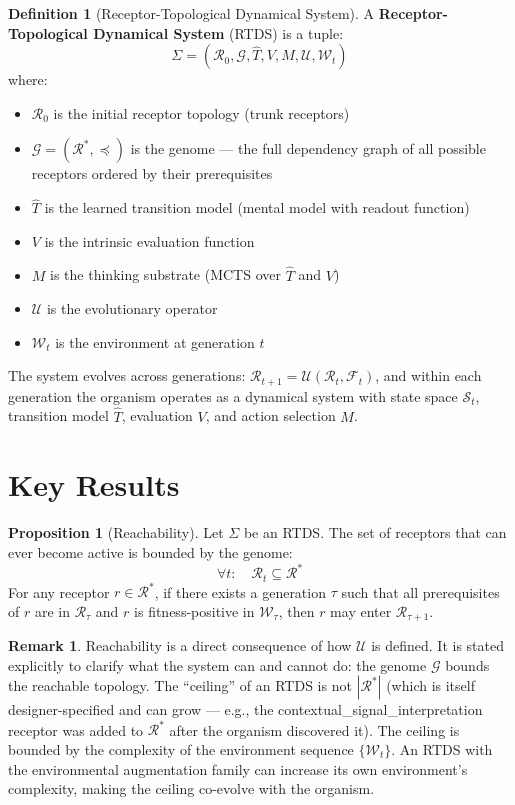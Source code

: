 \documentclass[12pt]{article}
\theoremstyle{definition}
\newtheorem{definition}{Definition}
\newtheorem{proposition}{Proposition}
\newtheorem{remark}{Remark}
\begin{document}
\begin{definition}[Receptor-Topological Dynamical System]
A \textbf{Receptor-Topological Dynamical System} (RTDS) is a tuple:
\[
\Sigma = (\mathcal{R}_0, \mathcal{G}, \hat{T}, V, M, \mathcal{U}, \mathcal{W}_t)
\]
where:
\begin{itemize}
    \item $\mathcal{R}_0$ is the initial receptor topology (trunk receptors)
    \item $\mathcal{G} = (\mathcal{R}^*, \preceq)$ is the genome --- the full dependency graph
    of all possible receptors ordered by their prerequisites
    \item $\hat{T}$ is the learned transition model (mental model with readout function)
    \item $V$ is the intrinsic evaluation function
    \item $M$ is the thinking substrate (MCTS over $\hat{T}$ and $V$)
    \item $\mathcal{U}$ is the evolutionary operator
    \item $\mathcal{W}_t$ is the environment at generation $t$
\end{itemize}
The system evolves across generations: $\mathcal{R}_{t+1} = \mathcal{U}(\mathcal{R}_t, \mathcal{F}_t)$,
and within each generation the organism operates as a dynamical system with state space
$\mathcal{S}_t$, transition model $\hat{T}$, evaluation $V$, and action selection $M$.
\end{definition}

\section{Key Results}

\begin{proposition}[Reachability]
Let $\Sigma$ be an RTDS. The set of receptors that can ever become active is bounded by
the genome:
\[
\forall t: \quad \mathcal{R}_t \subseteq \mathcal{R}^*
\]
For any receptor $r \in \mathcal{R}^*$, if there exists a generation $\tau$ such that
all prerequisites of $r$ are in $\mathcal{R}_\tau$ and $r$ is fitness-positive in
$\mathcal{W}_\tau$, then $r$ may enter $\mathcal{R}_{\tau+1}$.
\end{proposition}

\begin{remark}
Reachability is a direct consequence of how $\mathcal{U}$ is defined. It is stated
explicitly to clarify what the system can and cannot do: the genome $\mathcal{G}$
bounds the reachable topology. The ``ceiling'' of an RTDS is not
$|\mathcal{R}^*|$ (which is itself designer-specified and can grow --- e.g., the
contextual\_signal\_interpretation receptor was added to $\mathcal{R}^*$ after the
organism discovered it). The ceiling is bounded by the complexity of the environment
sequence $\{\mathcal{W}_t\}$. An RTDS with the environmental augmentation family
can increase its own environment's complexity, making the ceiling co-evolve with
the organism.
\end{remark}
\end{document}
